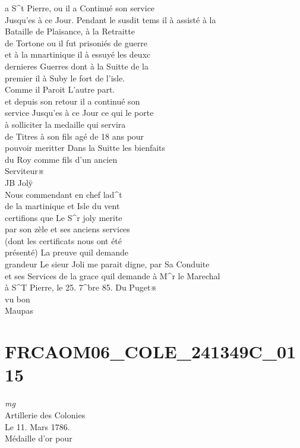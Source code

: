 \documentclass{article}
\begin{document}
\begin{pages}
a S\^{}t Pierre, ou il a Continué son service\\
Jusqu'es à ce Jour.
\pend\pstart
Pendant le susdit tems il à assisté à la\\
Bataille de Plaisance, à la Retraitte\\
de Tortone ou il fut prisoniés de guerre\\
et à la mnartinique il à essuyé les deuxc\\
dernieres Guerres dont à la Suitte de la\\
premier il à Suby le fort de l'isle.\\
Comme il Paroit L'autre part.\\
et depuis son retour il a continué son\\
service Jusqu'es à ce Jour ce qui le porte\\
à solliciter la medaille qui servira\\
de Titres à son fils agé de 18 ans pour\\
pouvoir meritter Dans la Suitte les bienfaits\\
du Roy comme fils d'un ancien\\
Serviteur※\\
JB Jolÿ\\
Nous commendant en chef lad\^{}t\\
de la martinique et Isle du vent\\
certifions que Le S\^{}r joly merite\\
par son zèle et ses anciens services\\
(dont les certificats nous ont été\\
présenté) La preuve quil demande\\
grandeur
\pend\pstart
Le sieur Joli me parait digne, par Sa Conduite\\
et ses Services de la grace quil demande à M\^{}r le Marechal\\
à S\^{}T Pierre, le 25. 7\^{}bre 85. Du Puget※\\
vu bon\\
Maupas
\pend
\endnumbering\beginnumbering\section{FRCAOM06\_COLE\_241349C\_0115}
\vspace{0.5cm}\noindent
\textit{mg}
\footnotesize \\
Artillerie des Colonies\\
Le 11. Mars 1786.\\
Médaille d'or pour\\

\end{pages}
\end{document}
